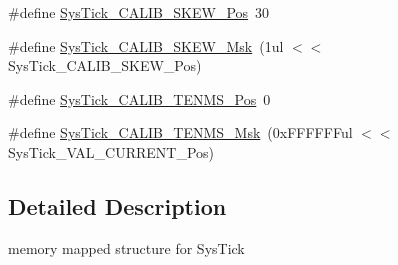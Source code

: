 \begin{DoxyCompactItemize}
\item 
\#define \hyperlink{group___c_m_s_i_s___c_m3___sys_tick_gadd0c9cd6641b9f6a0c618e7982954860}{Sys\-Tick\-\_\-\-C\-A\-L\-I\-B\-\_\-\-S\-K\-E\-W\-\_\-\-Pos}~30
\item 
\#define \hyperlink{group___c_m_s_i_s___c_m3___sys_tick_ga8a6a85a87334776f33d77fd147587431}{Sys\-Tick\-\_\-\-C\-A\-L\-I\-B\-\_\-\-S\-K\-E\-W\-\_\-\-Msk}~(1ul $<$$<$ Sys\-Tick\-\_\-\-C\-A\-L\-I\-B\-\_\-\-S\-K\-E\-W\-\_\-\-Pos)
\item 
\#define \hyperlink{group___c_m_s_i_s___c_m3___sys_tick_gacae558f6e75a0bed5d826f606d8e695e}{Sys\-Tick\-\_\-\-C\-A\-L\-I\-B\-\_\-\-T\-E\-N\-M\-S\-\_\-\-Pos}~0
\item 
\#define \hyperlink{group___c_m_s_i_s___c_m3___sys_tick_gaf1e68865c5aece2ad58971225bd3e95e}{Sys\-Tick\-\_\-\-C\-A\-L\-I\-B\-\_\-\-T\-E\-N\-M\-S\-\_\-\-Msk}~(0x\-F\-F\-F\-F\-F\-Ful $<$$<$ Sys\-Tick\-\_\-\-V\-A\-L\-\_\-\-C\-U\-R\-R\-E\-N\-T\-\_\-\-Pos)
\end{DoxyCompactItemize}


\subsection{Detailed Description}
memory mapped structure for Sys\-Tick 

